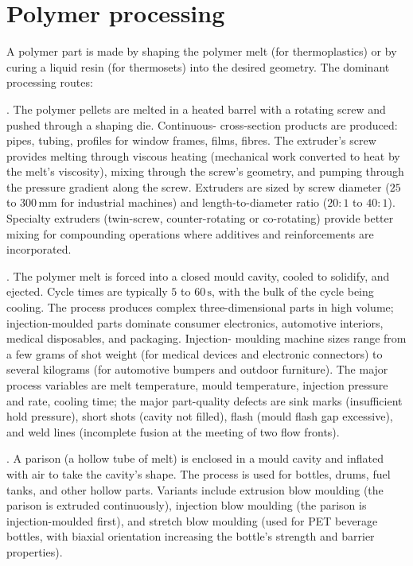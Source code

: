 \section{Polymer processing}

A polymer part is made by shaping the polymer melt (for thermoplastics)
or by curing a liquid resin (for thermosets) into the desired
geometry. The dominant processing routes:

. The polymer pellets are melted in a heated barrel
with a rotating screw and pushed through a shaping die. Continuous-
cross-section products are produced: pipes, tubing, profiles for
window frames, films, fibres. The extruder's screw provides melting
through viscous heating (mechanical work converted to heat by the
melt's viscosity), mixing through the screw's geometry, and pumping
through the pressure gradient along the screw. Extruders are sized by
screw diameter ($25$ to $300\,\text{mm}$ for industrial machines) and
length-to-diameter ratio ($20:1$ to $40:1$). Specialty extruders
(twin-screw, counter-rotating or co-rotating) provide better mixing
for compounding operations where additives and reinforcements are
incorporated.

. The polymer melt is forced into a closed
mould cavity, cooled to solidify, and ejected. Cycle times are
typically $5$ to $60\,\si{\second}$, with the bulk of the cycle being
cooling. The process produces complex three-dimensional parts in high
volume; injection-moulded parts dominate consumer electronics,
automotive interiors, medical disposables, and packaging. Injection-
moulding machine sizes range from a few grams of shot weight (for
medical devices and electronic connectors) to several kilograms (for
automotive bumpers and outdoor furniture). The major process variables
are melt temperature, mould temperature, injection pressure and rate,
cooling time; the major part-quality defects are sink marks (insufficient
hold pressure), short shots (cavity not filled), flash (mould flash
gap excessive), and weld lines (incomplete fusion at the meeting of
two flow fronts).

. A parison (a hollow tube of melt) is enclosed
in a mould cavity and inflated with air to take the cavity's shape.
The process is used for bottles, drums, fuel tanks, and other hollow
parts. Variants include extrusion blow moulding (the parison is
extruded continuously), injection blow moulding (the parison is
injection-moulded first), and stretch blow moulding (used for PET
beverage bottles, with biaxial orientation increasing the bottle's
strength and barrier properties).

